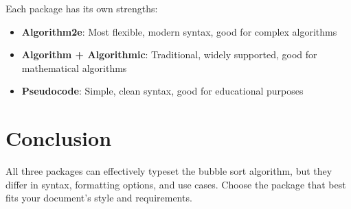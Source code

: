 \documentclass[12pt]{article}
\begin{document}
Each package has its own strengths:

\begin{itemize}
    \item \textbf{Algorithm2e}: Most flexible, modern syntax, good for complex algorithms
    \item \textbf{Algorithm + Algorithmic}: Traditional, widely supported, good for mathematical algorithms
    \item \textbf{Pseudocode}: Simple, clean syntax, good for educational purposes
\end{itemize}

\section{Conclusion}

All three packages can effectively typeset the bubble sort algorithm, but they differ in syntax, formatting options, and use cases. Choose the package that best fits your document's style and requirements.
\end{document}
